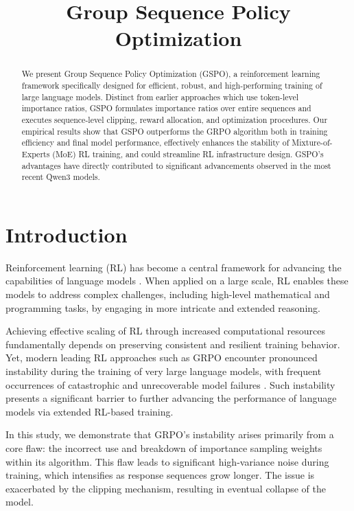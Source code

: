 \title{Group Sequence Policy Optimization}

\begin{abstract}
We present Group Sequence Policy Optimization (GSPO), a reinforcement learning framework specifically designed for efficient, robust, and high-performing training of large language models. Distinct from earlier approaches which use token-level importance ratios, GSPO formulates importance ratios over entire sequences and executes sequence-level clipping, reward allocation, and optimization procedures. Our empirical results show that GSPO outperforms the GRPO algorithm both in training efficiency and final model performance, effectively enhances the stability of Mixture-of-Experts (MoE) RL training, and could streamline RL infrastructure design. GSPO's advantages have directly contributed to significant advancements observed in the most recent Qwen3 models.
\end{abstract}

\section{Introduction}
\label{sec:intro}

Reinforcement learning (RL) has become a central framework for advancing the capabilities of language models \citep{o1,dpsk-r1,qwq32b,qwen3}. When applied on a large scale, RL enables these models to address complex challenges, including high-level mathematical and programming tasks, by engaging in more intricate and extended reasoning.

Achieving effective scaling of RL through increased computational resources fundamentally depends on preserving consistent and resilient training behavior. Yet, modern leading RL approaches such as GRPO \citep{grpo} encounter pronounced instability during the training of very large language models, with frequent occurrences of catastrophic and unrecoverable model failures \citep{qwen3, minimax-m1}. Such instability presents a significant barrier to further advancing the performance of language models via extended RL-based training.

In this study, we demonstrate that GRPO's instability arises primarily from a core flaw: the incorrect use and breakdown of importance sampling weights within its algorithm. This flaw leads to significant high-variance noise during training, which intensifies as response sequences grow longer. The issue is exacerbated by the clipping mechanism, resulting in eventual collapse of the model.

